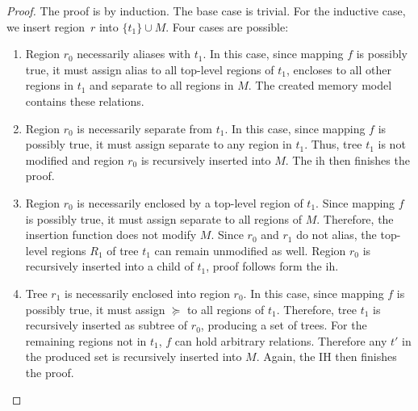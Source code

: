 \begin{proof}
  The proof is by induction.
  The base case is trivial.
  For the inductive case, we insert region~$r$ into $\{t_1\} \cup M$.
  Four cases are possible:
  \begin{enumerate}[style=unboxed,leftmargin=0cm,labelindent=0pt,wide] %
    \item Region $r_0$ necessarily aliases with $t_1$.
    In this case, since mapping $f$ is possibly true, it must assign \gls{alias} to all top-level regions of $t_1$, \gls{encloses} to all other regions in $t_1$ and \gls{separate} to all regions in $M$.
    The created memory model contains these relations.
    \item Region $r_0$ is necessarily separate from $t_1$.
    In this case, since mapping $f$ is possibly true, it must assign \gls{separate} to any region in $t_1$.
    Thus, tree $t_1$ is not modified and region $r_0$ is recursively inserted into $M$.
    The \ac{ih} then finishes the proof.
    \item Region $r_0$ is necessarily enclosed by a top-level region of $t_1$.
    Since mapping $f$ is possibly true, it must assign \gls{separate} to all regions of $M$.
    Therefore, the insertion function does not modify $M$.
    Since $r_0$ and $r_1$ do not alias, the top-level regions $R_1$ of tree $t_1$ can remain unmodified as well.
    Region $r_0$ is recursively inserted into a child of $t_1$, proof follows form the \ac{ih}.
    \item Tree $r_1$ is necessarily enclosed into region $r_0$.
    In this case, since mapping $f$ is possibly true, it must assign $\succeq$ to all regions of $t_1$.
    Therefore, tree $t_1$ is recursively inserted as subtree of $r_0$, producing a set of trees.
    For the remaining regions not in $t_1$, $f$ can hold arbitrary relations.
    Therefore any $t'$ in the produced set is recursively inserted into $M$.
    Again, the IH then finishes the proof.
  \end{enumerate}
\end{proof}

